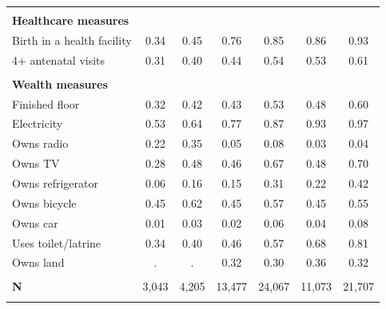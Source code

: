 \begin{tabular}{lcccccc}
&&&&&&\\
\textbf{Healthcare measures}&&&&&&\\
\hspace*{2em}Birth in a health facility&0.34&0.45&0.76&0.85&0.86&0.93\\
\hspace*{2em}4+ antenatal visits&0.31&0.40&0.44&0.54&0.53&0.61\\
&&&&&&\\
\textbf{Wealth measures}&&&&&&\\
\hspace*{2em}Finished floor&0.32&0.42&0.43&0.53&0.48&0.60\\
\hspace*{2em}Electricity&0.53&0.64&0.77&0.87&0.93&0.97\\
\hspace*{2em}Owns radio&0.22&0.35&0.05&0.08&0.03&0.04\\
\hspace*{2em}Owns TV&0.28&0.48&0.46&0.67&0.48&0.70\\
\hspace*{2em}Owns refrigerator&0.06&0.16&0.15&0.31&0.22&0.42\\
\hspace*{2em}Owns bicycle&0.45&0.62&0.45&0.57&0.45&0.55\\
\hspace*{2em}Owns car&0.01&0.03&0.02&0.06&0.04&0.08\\
\hspace*{2em}Uses toilet/latrine&0.34&0.40&0.46&0.57&0.68&0.81\\
\hspace*{2em}Owns land&.&.&0.32&0.30&0.36&0.32\\
&&&&&&\\
\textbf{N}&3,043&4,205&13,477&24,067&11,073&21,707\\
&&&&&&\\
\bottomrule
\end{tabular}
